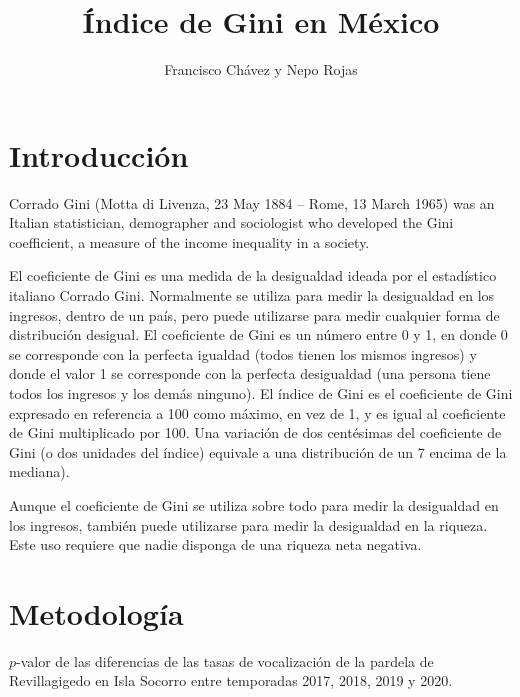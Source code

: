 \documentclass{article}
\author{Francisco Chávez y Nepo Rojas}
\title{Índice de Gini en México}
\begin{document}
\begin{pycode}
\end{pycode}

\maketitle
\begin{abstract}
\end{abstract}

\section*{Introducción}
Corrado Gini (Motta di Livenza, 23 May 1884 – Rome, 13 March 1965) was an Italian statistician,
demographer and sociologist who developed the Gini coefficient, a measure of the income inequality
in a society.

El coeficiente de Gini es una medida de la desigualdad ideada por el estadístico italiano Corrado
Gini. Normalmente se utiliza para medir la desigualdad en los ingresos, dentro de un país, pero
puede utilizarse para medir cualquier forma de distribución desigual. El coeficiente de Gini es un
número entre 0 y 1, en donde 0 se corresponde con la perfecta igualdad (todos tienen los mismos
ingresos) y donde el valor 1 se corresponde con la perfecta desigualdad (una persona tiene todos los
ingresos y los demás ninguno). El índice de Gini es el coeficiente de Gini expresado en referencia a
100 como máximo, en vez de 1, y es igual al coeficiente de Gini multiplicado por 100. Una variación
de dos centésimas del coeficiente de Gini (o dos unidades del índice) equivale a una distribución de
un 7%
encima de la mediana).

Aunque el coeficiente de Gini se utiliza sobre todo para medir la desigualdad en los ingresos,
también puede utilizarse para medir la desigualdad en la riqueza. Este uso requiere que nadie
disponga de una riqueza neta negativa.\cite{carpenter2000}

\section*{Metodología}
\begin{table}[H]
\centering
\caption{$p$-valor de las diferencias de las tasas de vocalización de la pardela de Revillagigedo 
en Isla Socorro entre temporadas 2017, 2018, 2019 y 2020.}
\label{table:diferenciasTasas}
\end{table}
\end{document}
